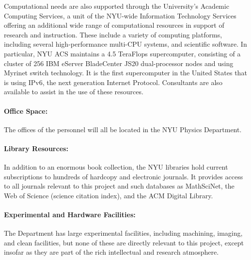 \documentclass[letterpaper,12pt]{article}
\begin{document}
Computational needs are also supported through the University's
Academic Computing Services, a unit of the NYU-wide Information
Technology Services offering an additional wide range of computational
resources in support of research and instruction.  These include a
variety of computing platforms, including several high-performance
multi-CPU systems, and scientific software.  In particular, NYU ACS
maintains a 4.5 TeraFlops supercomputer, consisting of a cluster of
256 IBM eServer BladeCenter JS20 dual-processor nodes and using
Myrinet switch technology. It is the first supercomputer in the United
States that is using IPv6, the next generation Internet Protocol.
Consultants are also available to assist in the use of these
resources.

\paragraph{Office Space:}

The offices of the personnel will all be located in the NYU Physics
Department.

\paragraph{Library Resources:}

In addition to an enormous book collection, the NYU libraries hold
current subscriptions to hundreds of hardcopy and electronic journals.
It provides access to all journals relevant to this project and such
databases as MathSciNet, the Web of Science (science citation index),
and the ACM Digital Library.

\paragraph{Experimental and Hardware Facilities:}

The Department has large experimental facilities, including machining,
imaging, and clean facilities, but none of these are directly relevant
to this project, except insofar as they are part of the rich
intellectual and research atmosphere.
\end{document}
